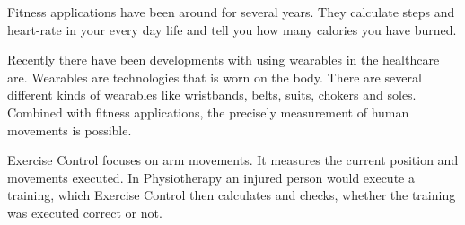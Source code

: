 
Fitness applications have been around for several years. They calculate steps and heart-rate in your every day life and tell you how many calories you have burned.

Recently there have been developments with using wearables in the healthcare are.
Wearables are technologies that is worn on the body. There are several different kinds of wearables like wristbands, belts, suits, chokers and soles. Combined with fitness applications, the precisely measurement of human movements is possible.

Exercise Control focuses on arm movements. It measures the current position and movements executed. In Physiotherapy an injured person would execute a training, which Exercise Control then calculates and checks, whether the training was executed correct or not.
